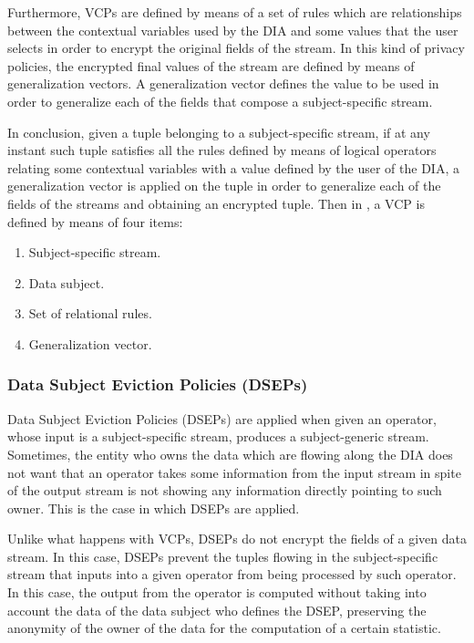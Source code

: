 Furthermore, VCPs are defined by means of a set of rules which are relationships between the contextual variables used by the DIA and some values that the user selects in order to encrypt the original fields of the stream. In this kind of privacy policies, the encrypted final values of the stream are defined by means of generalization vectors. A generalization vector defines the value to be used in order to generalize each of the fields that compose a subject-specific stream.

In conclusion, given a tuple belonging to a subject-specific stream, if at any instant such tuple satisfies all the rules defined by means of logical operators relating some contextual variables with a value defined by the user of the DIA, a generalization vector is applied on the tuple in order to generalize each of the fields of the streams and obtaining an encrypted tuple. Then in \cite{privacypoliciesarticle}, a VCP is defined by means of four items:

\begin{enumerate}

\item Subject-specific stream.
\item Data subject.
\item Set of relational rules.
\item Generalization vector.

\end{enumerate}

\subsubsection{Data Subject Eviction Policies (DSEPs)}

Data Subject Eviction Policies (DSEPs) are applied when given an operator, whose input is a subject-specific stream, produces a subject-generic stream. Sometimes, the entity who owns the data which are flowing along the DIA does not want that an operator takes some information from the input stream in spite of the output stream is not showing any information directly pointing to such owner. This is the case in which DSEPs are applied.

Unlike what happens with VCPs, DSEPs do not encrypt the fields of a given data stream. In this case, DSEPs prevent the tuples flowing in the subject-specific stream that inputs into a given operator from being processed by such operator. In this case, the output from the operator is computed without taking into account the data of the data subject who defines the DSEP, preserving the anonymity of the owner of the data for the computation of a certain statistic.

